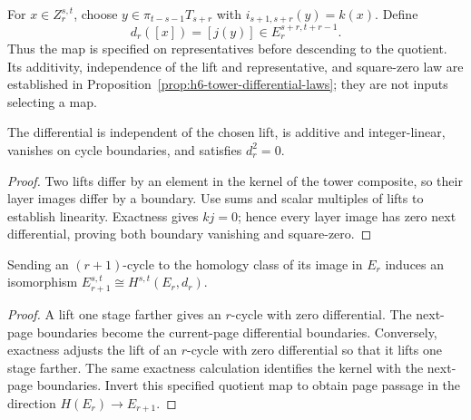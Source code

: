\begin{definition}
  \label{def:h6-tower-differential}
  \notready
  For $x\in Z_r^{s,t}$, choose $y\in\pi_{t-s-1}T_{s+r}$ with
  $i_{s+1,s+r}(y)=k(x)$.  Define
  \[
    d_r([x])=[j(y)]\in E_r^{s+r,t+r-1}.
  \]
  Thus the map is specified on representatives before descending to the
  quotient.  Its additivity, independence of the lift and representative,
  and square-zero law are established in Proposition~\ref{prop:h6-tower-differential-laws}; they are not inputs selecting a map.
\end{definition}

\begin{proposition}
  \label{prop:h6-tower-differential-laws}
  \leanok
  The differential is independent of the chosen lift, is additive and
  integer-linear, vanishes on cycle boundaries, and satisfies $d_r^2=0$.
\end{proposition}
\begin{proof}
  Two lifts differ by an element in the kernel of the tower composite,
  so their layer images differ by a boundary. Use sums and scalar multiples
  of lifts to establish linearity. Exactness gives $kj=0$; hence every
  layer image has zero next differential, proving both boundary vanishing
  and square-zero.
  \leanok
\end{proof}

\begin{proposition}
  \label{prop:h6-tower-page-passage}
  \notready
  Sending an $(r+1)$-cycle to the homology class of its image in $E_r$
  induces an isomorphism $E_{r+1}^{s,t}\cong H^{s,t}(E_r,d_r)$.
\end{proposition}
\begin{proof}
  A lift one stage farther gives an $r$-cycle with zero differential.
  The next-page boundaries become the current-page differential boundaries.
  Conversely, exactness adjusts the lift of an $r$-cycle with zero
  differential so that it lifts one stage farther.  The same exactness
  calculation identifies the kernel with the next-page boundaries.
  Invert this specified quotient map to obtain page passage in the
  direction $H(E_r)\to E_{r+1}$.
\end{proof}

